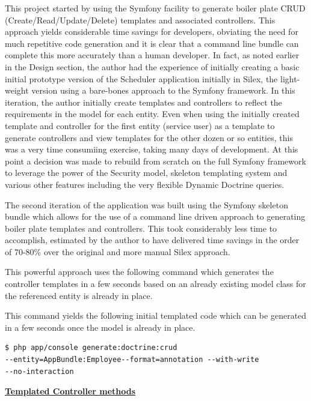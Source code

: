 \documentclass[a4paper,12pt]{article}
\begin{document}
This project started by using the Symfony facility to generate boiler plate CRUD (Create/Read/Update/Delete) templates and associated controllers. This approach yields considerable time savings for developers, obviating the need for much repetitive code generation and it is clear that a command line bundle can complete this more accurately than a human developer. In fact, as noted earlier in the Design section, the author had the experience of initially creating a basic initial prototype version of the Scheduler application initially in Silex, the light-weight version using a bare-bones approach to the Symfony framework. In this iteration, the author initially create templates and controllers to reflect the requirements in the model for each entity. Even when using the initially created template and controller for the first entity (service user) as a template to generate controllers and view templates for the other dozen or so entities, this was a very time consumiing exercise, taking many days of development. At this point a decision was made to rebuild from scratch on the full Symfony framework to leverage the power of the Security model, skeleton templating system and various other features including the very flexible Dynamic Doctrine queries. 

The second iteration of the application was built using the Symfony skeleton bundle which allows for the use of a command line driven approach to 
generating boiler plate templates and controllers. This took considerably less time to accomplish, estimated by the author to have delivered time savings in the order of 70-80\% over the original and more manual Silex approach.

This powerful approach uses the following command which generates the controller templates  in a few seconds based on an already existing model class for the referenced entity is already in place.

This command yields the following initial templated code which can be generated in a few seconds once the model is already in place.

\begin{verbatim}
$ php app/console generate:doctrine:crud 
--entity=AppBundle:Employee--format=annotation --with-write
--no-interaction
\end{verbatim}

\textbf {\underline{Templated Controller methods}}
\end{document}

